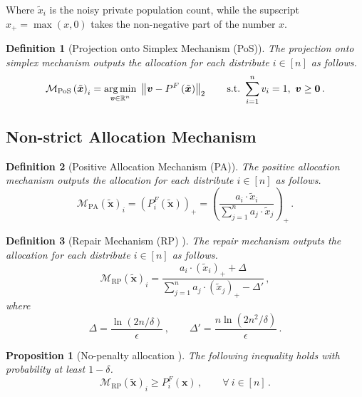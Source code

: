 \documentclass[9pt,twocolumn,twoside,lineno]{pnas-new}
\newtheorem{definition}{Definition}
\newcommand{\cM}{\mathcal{M}}
\newcommand{\truedata}{\bm{x}}
\newcommand{\noisyalloc}{\alloc{\noisydata}}
\newcommand{\noisydata}{\tilde{\bm{x}}}
\newcommand{\norm}[1]{\left\lVert#1\right\rVert}
\newtheorem{proposition}{Proposition}
\newcommand{\relu}[1]{\left(#1\right)_+}
\newcommand{\alloc}[1]{P^F\left(#1\right)}
\newcommand{\posmech}[1]{\cM_{\mathrm{PoS}}\left(#1\right)}
\newcommand{\pamech}[1]{\cM_{\mathrm{PA}}\left(#1\right)}
\newcommand{\rpmech}[1]{\cM_{\mathrm{RP}}\left(#1\right)}
\newcommand{\talloci}[1]{P^F_{#1}\left(\truedata\right)}
\newcommand{\nalloci}[1]{P^F_{#1}\left(\noisydata\right)}
\begin{document}
Where $\tilde{x}_i$ is the noisy private population count, while the supscript $x_{+} = \max(x, 0)$ takes the non-negative part of the number $x$.


    \begin{definition}[Projection onto Simplex Mechanism (PoS)]
        The \emph{projection onto simplex mechanism} outputs the allocation for each distribute $i\in [n]$ as follows.
        \begin{equation*}
            \posmech{\noisydata}_i = \underset{\bm{v}\in\RR^n}{\arg\min}~\norm{\bm{v}-\noisyalloc}_2\qquad\mathrm{s.t.}~
            \sum_{i=1}^n v_i = 1,~\bm{v}\geq \bm{0}\,.
        \end{equation*}
    \end{definition}
    
    \subsection*{Non-strict Allocation Mechanism}
    \begin{definition}[Positive Allocation Mechanism (PA)]
        The \emph{positive allocation mechanism} 
        outputs the allocation for each distribute $i\in [n]$ as follows.
        \begin{equation*}
            \pamech{\noisydata}_i  =  \relu{\nalloci{i}}= \relu{\frac{a_i\cdot \tilde{x}_i}{\sum_{j=1}^n a_j\cdot \tilde{x}_j}}\,.
        \end{equation*}
    \end{definition}
    \begin{definition}[Repair Mechanism (RP) \cite{pujol2020fair}]
        The \emph{repair mechanism} outputs the allocation for each distribute $i\in [n]$ as follows.
        \begin{equation*}
            \rpmech{\noisydata}_i  = \frac{a_i\cdot \relu{\tilde{x}_i}+\Delta}{\sum_{j=1}^n a_j\cdot \relu{\tilde{x}_j} - \Delta'}\,,
        \end{equation*}
        where 
        \begin{equation*}
            \Delta= \frac{\ln\left(2n/\delta\right)}{\epsilon}\,,\qquad\Delta' = 
            \frac{n\ln\left(2n^2/\delta\right)}{\epsilon}\,.
        \end{equation*}
    \end{definition}
    
    \begin{proposition}[No-penalty allocation \cite{pujol2020fair}]
        The following inequality holds with probability at least $1-\delta$.
        \begin{equation*}
            \rpmech{\noisydata}_i\geq \talloci{i}\,,\qquad\forall~i\in[n]\,.
        \end{equation*}
    \end{proposition}
\end{document}
